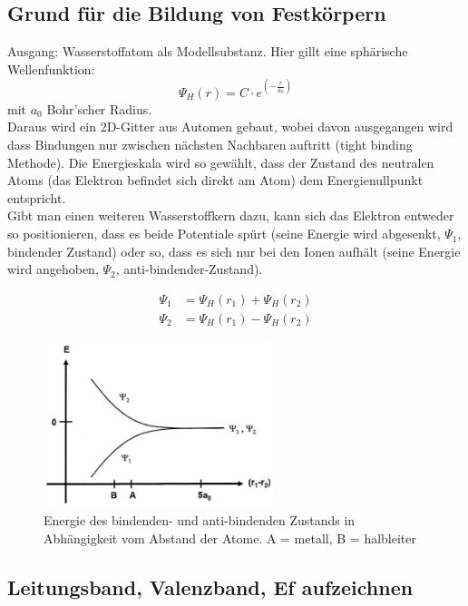 \subsection{Grund für die Bildung von Festkörpern }\label{k2:festkorper}
Ausgang: Wasserstoffatom als Modellsubstanz. Hier gillt eine sph\"arische Wellenfunktion:
\begin{equation}
    \Psi_H(r) = C \cdot e^{(-\frac{r}{a_0})}
\end{equation}
mit $a_0$ Bohr'scher Radius.\\
Daraus wird ein 2D-Gitter aus Automen gebaut, wobei davon ausgegangen wird dass Bindungen nur zwischen n\"achsten Nachbaren auftritt (tight binding Methode).
Die Energieskala wird so gew\"ahlt, dass der Zustand des neutralen Atoms (das Elektron befindet sich direkt am Atom) dem Energienullpunkt entspricht.\\
Gibt man einen weiteren Wasserstoffkern dazu, kann sich das Elektron entweder so positionieren, dass es beide Potentiale sp\"urt (seine Energie wird abgesenkt, $\Psi_1$, bindender Zustand) oder so, dass es sich nur bei den Ionen aufhält (seine Energie wird angehoben, $\Psi_2$, anti-bindender-Zustand).
\begin{center}
    \begin{align*}
        \Psi_1 &= \Psi_H(r_1)+\Psi_H(r_2)\\
        \Psi_2 &= \Psi_H(r_1)-\Psi_H(r_2)
    \end{align*}
\end{center}
\begin{figure}[h]
        \centering
        \includegraphics[width=0.6\textwidth]{fig/atomdistanz}
        \caption{Energie des bindenden- und anti-bindenden Zustands in Abh\"angigkeit vom Abstand der Atome. A = metall, B = halbleiter}
        \label{fig:atomdistanz}
\end{figure}
\subsection{Leitungsband, Valenzband, Ef aufzeichnen }\label{k2:leitungsBand}


